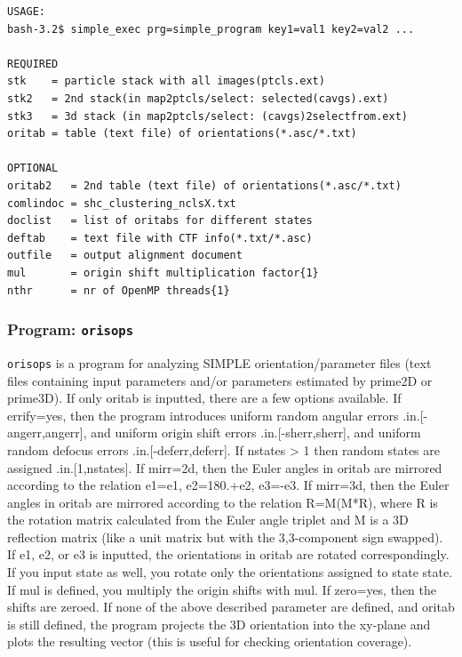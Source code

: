 \documentclass[a4paper,11pt]{article}
\newcommand{\prgname}[1]{\textcolor{NavyBlue}{\texttt{#1}}}
\begin{document}
\begin{verbatim}
USAGE:
bash-3.2$ simple_exec prg=simple_program key1=val1 key2=val2 ...

REQUIRED
stk    = particle stack with all images(ptcls.ext)
stk2   = 2nd stack(in map2ptcls/select: selected(cavgs).ext)
stk3   = 3d stack (in map2ptcls/select: (cavgs)2selectfrom.ext)
oritab = table (text file) of orientations(*.asc/*.txt)

OPTIONAL
oritab2   = 2nd table (text file) of orientations(*.asc/*.txt)
comlindoc = shc_clustering_nclsX.txt
doclist   = list of oritabs for different states
deftab    = text file with CTF info(*.txt/*.asc)
outfile   = output alignment document
mul       = origin shift multiplication factor{1}
nthr      = nr of OpenMP threads{1}
\end{verbatim}

\subsubsection{Program: \prgname{orisops}}
\label{orisops}
\prgname{orisops} is a program for analyzing SIMPLE orientation/parameter files (text files containing input parameters and/or parameters estimated by prime2D or prime3D). If only oritab is inputted, there are a few options available. If errify=yes, then the program introduces uniform random angular errors .in.[-angerr,angerr], and uniform origin shift errors .in.[-sherr,sherr], and uniform random defocus errors .in.[-deferr,deferr]. If nstates > 1 then random states are assigned .in.[1,nstates]. If mirr=2d, then the Euler angles in oritab are mirrored according to the relation e1=e1, e2=180.+e2, e3=-e3. If mirr=3d, then the Euler angles in oritab are mirrored according to the relation R=M(M*R), where R is the rotation matrix calculated from the Euler angle triplet and M is a 3D reflection matrix (like a unit matrix but with the 3,3-component sign swapped). If e1, e2, or e3 is inputted, the orientations in oritab are rotated correspondingly. If you input state as well, you rotate only the orientations assigned to state state. If mul is defined, you multiply the origin shifts with mul. If zero=yes, then the shifts are zeroed. If none of the above described parameter are defined, and oritab is still defined, the program projects the 3D orientation into the xy-plane and plots the resulting vector (this is useful for checking orientation coverage).
\end{document}
